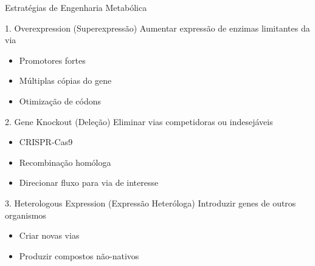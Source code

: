 \begin{frame}{Estratégias de Engenharia Metabólica}
\begin{block}{1. Overexpression (Superexpressão)}
Aumentar expressão de enzimas limitantes da via
\begin{itemize}
    \item Promotores fortes
    \item Múltiplas cópias do gene
    \item Otimização de códons
\end{itemize}
\end{block}

\begin{block}{2. Gene Knockout (Deleção)}
Eliminar vias competidoras ou indesejáveis
\begin{itemize}
    \item CRISPR-Cas9
    \item Recombinação homóloga
    \item Direcionar fluxo para via de interesse
\end{itemize}
\end{block}

\begin{block}{3. Heterologous Expression (Expressão Heteróloga)}
Introduzir genes de outros organismos
\begin{itemize}
    \item Criar novas vias
    \item Produzir compostos não-nativos
\end{itemize}
\end{block}
\end{frame}

